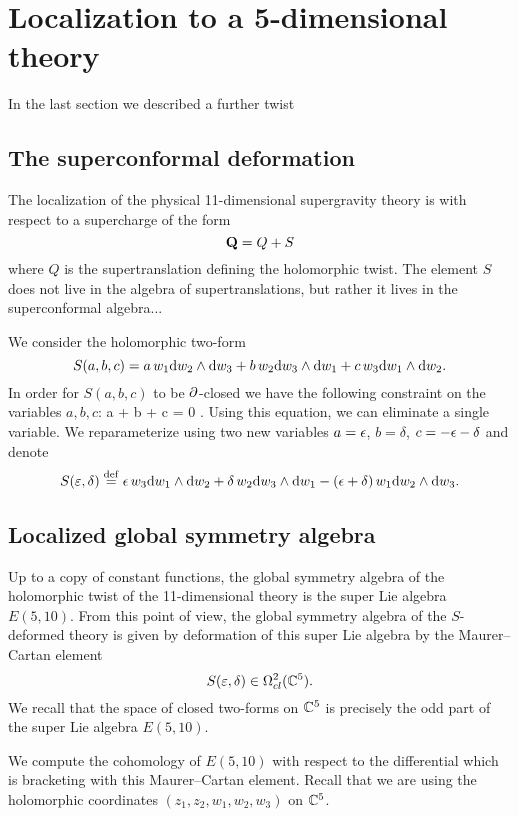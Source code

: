 \documentclass[11pt]{amsart}
\def\vep{\varepsilon}
\begin{document}
\section{Localization to a 5-dimensional theory} 

In the last section we described a further twist 

\subsection{The superconformal deformation}

The localization of the physical 11-dimensional supergravity theory is with respect to a supercharge of the form 
\[
{\bf Q} = Q + S 
\]
where $Q$ is the supertranslation defining the holomorphic twist. 
The element $S$ does not live in the algebra of supertranslations, but rather it lives in the superconformal algebra...

We consider the holomorphic two-form
\[
S(a,b,c) = a \, w_1 {\rm d} w_2 \wedge {\rm d} w_3 + b \, w_2 {\rm d} w_3 \wedge {\rm d} w_1 + c \, w_3 {\rm d} w_1 \wedge {\rm d} w_2 .
\]
In order for $S(a,b,c)$ to be $\partial$-closed we have the following constraint on the variables $a,b,c$:
\beqn\label{eqn:abc}
a + b + c = 0 .
\eeqn
Using this equation, we can eliminate a single variable. 
We reparameterize using two new variables $a = \epsilon$, $b=\delta$, $c = -\epsilon - \delta$ and denote
\[
S(\vep, \delta) \define \ep \, w_3 \d w_1 \wedge \d w_2 + \delta \, w_2 \d w_3 \wedge \d w_1 - (\ep + \delta) \, w_1 \d w_2 \wedge \d w_3 .
\]

\subsection{Localized global symmetry algebra}

Up to a copy of constant functions, the global symmetry algebra of the holomorphic twist of the 11-dimensional theory is the super Lie algebra $E(5,10)$.
From this point of view, the global symmetry algebra of the $S$-deformed theory is given by deformation of this super Lie algebra by the Maurer--Cartan element 
\[
S(\vep, \delta) \in \Omega^{2}_{cl}(\CC^5) .
\]
We recall that the space of closed two-forms on $\mathbb C^5$ is precisely the odd part of the super Lie algebra $E(5,10)$. 

We compute the cohomology of $E(5,10)$ with respect to the differential which is bracketing with this Maurer--Cartan element. 
Recall that we are using the holomorphic coordinates $(z_1,z_2,w_1,w_2,w_3)$ on $\mathbb C^5$. 
\end{document}
